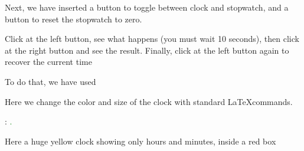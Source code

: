 \documentclass[10pt]{beamer}
\begin{document}
\begin{frame}


Next, we have inserted a button to toggle between clock and stopwatch,
and a button to reset the stopwatch to zero.

\medskip
{}
\tdtime
{}

\medskip

Click at the left button, see what happens (you must wait 10 seconds),
then click at the right button and see the result.
Finally, click at the left button again to recover the current time

\bigskip

To do that, we have used

\medskip


\end{frame}

%

\begin{frame}

Here we change the color and size of the clock with
standard \LaTeX commands.

: %
\textcolor{green}{\Large \tdhours.\tdminutes}

\bigskip

Here a huge yellow clock showing only hours and minutes, inside a red box


\begin{center}
\colorbox{red}{\color{yellow} \hhmm {} \tdtime}
\end{center}

\end{frame}
\end{document}
